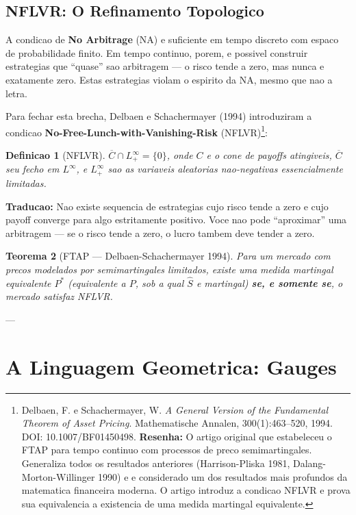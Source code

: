 \documentclass[12pt,a4paper]{article}
\newtheorem{teo}{Teorema}[section]
\newtheorem{defi}[teo]{Definicao}
\theoremstyle{remark}
\begin{document}
\subsection{NFLVR: O Refinamento Topologico}

A condicao de \textbf{No Arbitrage} (NA) e suficiente em tempo discreto com
espaco de probabilidade finito. Em tempo continuo, porem, e possivel construir
estrategias que ``quase'' sao arbitragem — o risco tende a zero, mas nunca e
exatamente zero. Estas estrategias violam o espirito da NA, mesmo que nao a
letra.

Para fechar esta brecha, Delbaen e Schachermayer (1994) introduziram a condicao
\textbf{No-Free-Lunch-with-Vanishing-Risk} (NFLVR)\footnote{Delbaen, F. e
Schachermayer, W. \textit{A General Version of the Fundamental Theorem of Asset
Pricing}. Mathematische Annalen, 300(1):463--520, 1994. DOI:
10.1007/BF01450498. \textbf{Resenha:} O artigo original que estabeleceu o FTAP
para tempo continuo com processos de preco semimartingales. Generaliza todos os
resultados anteriores (Harrison-Pliska 1981, Dalang-Morton-Willinger 1990) e e
considerado um dos resultados mais profundos da matematica financeira moderna.
O artigo introduz a condicao NFLVR e prova sua equivalencia a existencia de uma
medida martingal equivalente.}:

\begin{defi}[NFLVR]
$\overline{C} \cap L_+^\infty = \{0\}$, onde $C$ e o cone de payoffs atingiveis,
$\overline{C}$ seu fecho em $L^\infty$, e $L_+^\infty$ sao as variaveis
aleatorias nao-negativas essencialmente limitadas.
\end{defi}

\textbf{Traducao:} Nao existe sequencia de estrategias cujo risco tende a zero e
cujo payoff converge para algo estritamente positivo. Voce nao pode ``aproximar''
uma arbitragem — se o risco tende a zero, o lucro tambem deve tender a zero.

\begin{teo}[FTAP — Delbaen-Schachermayer 1994]
Para um mercado com precos modelados por semimartingales limitados, existe uma
medida martingal equivalente $P^*$ (equivalente a $P$, sob a qual $\hat{S}$ e
martingal) \textbf{se, e somente se}, o mercado satisfaz NFLVR.
\end{teo}

---

\section{A Linguagem Geometrica: Gauges}
\end{document}
